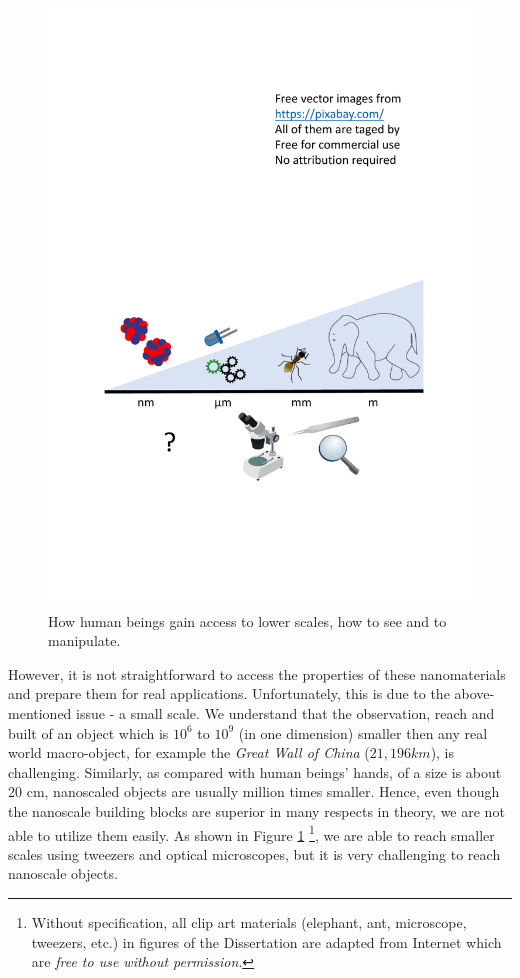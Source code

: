 \begin{figure} 
\centering
\includegraphics[width=\textwidth]{figures/figure1_scale_problem.pdf}
\caption[Scale problem]{How human beings gain access to lower scales, how to see and to manipulate.\footnotemark[1]
\label{fig:1_scale}}
\end{figure}

However, it is not straightforward to access the properties of these nanomaterials and prepare them for real applications. Unfortunately, this is due to the above-mentioned issue - a small scale. We understand that the observation, reach and built of an object which is $10^6$ to $10^9$ (in one dimension) smaller then any real world macro-object, for example the {\em Great Wall of China} ($21,196 km$), is challenging. Similarly, as compared with human beings' hands, of a size is about 20 cm, nanoscaled objects are usually million times smaller. Hence, even though the nanoscale building blocks are superior in many respects in theory, we are not able to utilize them easily. As shown in Figure \ref{fig:1_scale} \footnote{Without specification, all clip art materials (elephant, ant, microscope, tweezers, etc.) in figures of the Dissertation are adapted from Internet which are {\em free to use without permission}.}, we are able to reach smaller scales using tweezers and optical microscopes, but it is very challenging to reach nanoscale objects. \\

